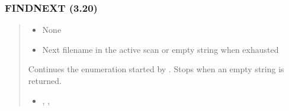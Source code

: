 \documentclass[letterpaper,10pt,english]{sphinxmanual}
\begin{document}
\begin{quote}
\begin{description}
\begin{itemize}
\end{itemize}

\end{description}
\end{quote}


\subsubsection{FINDNEXT (3.20)}
\label{\detokenize{ppl:id6}}\begin{quote}

\sphinxAtStartPar
{}
\begin{description}
\begin{itemize}
\item {} 
\sphinxAtStartPar
None

\end{itemize}

\begin{itemize}
\item {} 
\sphinxAtStartPar
Next filename in the active scan or empty string when exhausted

\end{itemize}

\sphinxAtStartPar
Continues the enumeration started by . Stops when an empty
string is returned.

\end{description}

\sphinxAtStartPar
{}
\begin{quote}

\begin{sphinxVerbatim}[commandchars=\\\{\}]
 
  
   
      
      
\end{sphinxVerbatim}
\end{quote}
\begin{description}
\begin{itemize}
\item {} 
\sphinxAtStartPar
{}, , 

\end{itemize}

\end{description}
\end{quote}
\end{document}
